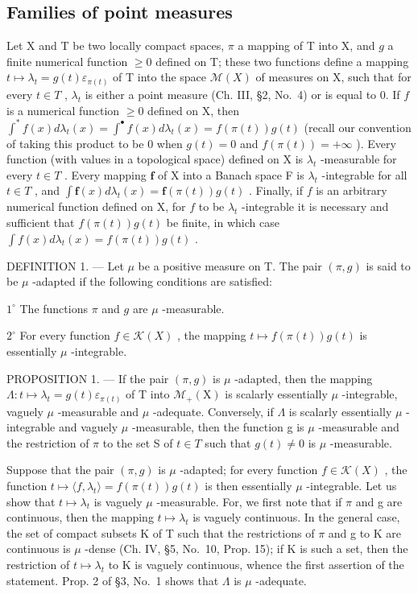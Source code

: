 \subsection{Families of point measures}

Let X and T be two locally compact spaces, \(\pi\) a mapping of T into X, and \(g\) a finite numerical function \(\geqslant 0\) defined on T; these two functions define a mapping \(t \mapsto \lambda_t = g(t)\varepsilon_{\pi(t)}\) of T into the space \(\mathcal{M}(X)\) of measures on X, such that for every \(t \in T\) , \(\lambda_t\) is either a point measure (Ch. III, §2, No.~4) or is equal to 0. If \(f\) is a numerical function \(\geqslant 0\) defined on X, then \(\int^{*} f(x) d\lambda_t(x) = \int^{\bullet} f(x) d\lambda_t(x) = f(\pi(t))g(t)\) (recall our convention of taking this product to be 0 when \(g(t) = 0\) and \(f(\pi(t)) = +\infty\) ). Every function (with values in a topological space) defined on X is \(\lambda_t\) -measurable for every \(t \in T\) . Every mapping \(\mathbf{f}\) of X into a Banach space F is \(\lambda_t\) -integrable for all \(t \in T\) , and \(\int \mathbf{f}(x) d\lambda_t(x) = \mathbf{f}(\pi(t))g(t)\) . Finally, if \(f\) is an arbitrary numerical function defined on X, for \(f\) to be \(\lambda_t\) -integrable it is necessary and sufficient that \(f(\pi(t))g(t)\) be finite, in which case \(\int f(x) d\lambda_t(x) = f(\pi(t))g(t)\) .

DEFINITION 1. --- Let \(\mu\) be a positive measure on T. The pair \((\pi, g)\) is said to be \(\mu\) -adapted if the following conditions are satisfied:

\(1^{\circ}\) The functions \(\pi\) and \(g\) are \(\mu\) -measurable.

\(2^{\circ}\) For every function \(f \in \mathcal{K}(X)\) , the mapping \(t \mapsto f(\pi(t))g(t)\) is essentially \(\mu\) -integrable.

PROPOSITION 1. --- If the pair \((\pi, g)\) is \(\mu\) -adapted, then the mapping \(\Lambda: t \mapsto \lambda_t = g(t) \varepsilon_{\pi(t)}\) of T into \(\mathcal{M}_+(\mathrm{X})\) is scalarly essentially \(\mu\) -integrable, vaguely \(\mu\) -measurable and \(\mu\) -adequate. Conversely, if \(\Lambda\) is scalarly essentially \(\mu\) -integrable and vaguely \(\mu\) -measurable, then the function g is \(\mu\) -measurable and the restriction of \(\pi\) to the set S of \(t \in T\) such that \(g(t) \neq 0\) is \(\mu\) -measurable.

Suppose that the pair \((\pi,g)\) is \(\mu\) -adapted; for every function \(f \in \mathcal{K}(X)\) , the function \(t \mapsto \langle f, \lambda_t \rangle = f(\pi(t))g(t)\) is then essentially \(\mu\) -integrable. Let us show that \(t \mapsto \lambda_t\) is vaguely \(\mu\) -measurable. For, we first note that if \(\pi\) and g are continuous, then the mapping \(t \mapsto \lambda_t\) is vaguely continuous. In the general case, the set of compact subsets K of T such that the restrictions of \(\pi\) and g to K are continuous is \(\mu\) -dense (Ch. IV, §5, No.~10, Prop. 15); if K is such a set, then the restriction of \(t \mapsto \lambda_t\) to K is vaguely continuous, whence the first assertion of the statement. Prop. 2 of §3, No.~1 shows that \(\Lambda\) is \(\mu\) -adequate.

